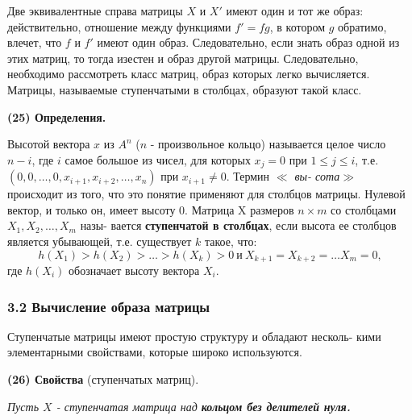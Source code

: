 \documentclass{mai_book}
\begin{document}
	Две эквивалентные справа матрицы $X$ и $X'$ имеют один и тот же\linebreak
	образ: действительно, отношение между функциями $f' = fg$, в котором\linebreak
	$g$ обратимо, влечет, что $f$ и $f'$ имеют один образ. Следовательно, если\linebreak
	знать образ одной из этих матриц, то тогда изестен и образ другой\linebreak
	матрицы. Следовательно, необходимо рассмотреть класс матриц, образ\linebreak
	которых легко вычисляется. Матрицы, называемые ступенчатыми в\linebreak
	столбцах, образуют такой класс.
	
	\noindent
	{\bf (25) Определения.}
	
	Высотой вектора $x$ из $A^{n}$ ($n$ - произвольное кольцо) называется\linebreak
	целое число $n - i$, где $i$ самое большое из чисел, для которых $x_{j} = 0$ при\linebreak
	$1 \leqslant j \leqslant i$, т.е. $(0, 0, \ldots, 0, x_{i + 1}, x_{i + 2}, \ldots, x_{n})$ при $x_{i + 1} \neq 0$. Термин {\it $\ll$ вы-\linebreak
	сота$\gg$} происходит из того, что это понятие применяют для столбцов\linebreak
	матрицы. Нулевой вектор, и только он, имеет высоту 0.\linebreak
	Матрица X размеров $n \times m$ со столбцами $X_{1}, X_{2}, \ldots, X_{m}$ назы-\linebreak
	вается {\bf ступенчатой в столбцах}, если высота ее столбцов является\linebreak
	убывающей, т.е. существует $k$ такое, что:
	$$h(X_{1}) > h(X_{2}) > \ldots > h(X_{k}) > 0 \ \text{и} \ X_{k + 1} = X_{k + 2} = \ldots X_{m} = 0,$$
	где $h(X_{i})$ обозначает высоту вектора $X_{i}$.
	
	\subsubsection{3.2 Вычисление образа матрицы}
	
	\noindent
	Ступенчатые матрицы имеют простую структуру и обладают несколь-\linebreak
	кими элементарными свойствами, которые широко используются.
	
	\noindent
	{\bf (26) Свойства} (ступенчатых матриц).
	
	{\it Пусть $X$ - ступенчатая матрица над {\bf кольцом без делителей\linebreak
	нуля.}}
\end{document}
